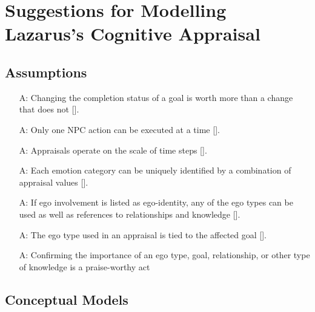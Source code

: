 \section{Suggestions for Modelling Lazarus's Cognitive
Appraisal}\label{appendix_lazarus}

\subsection{Assumptions}

\begin{itemize}
    \item[A\refstepcounter{assumpnum}\theassumpnum \label{A_AchievingGoals}:]
    Changing the completion status of a goal is worth more than a change that
    does not [].

    \item[A\refstepcounter{assumpnum}\theassumpnum \label{A_ActOn}:]
    Only one NPC action can be executed at a time [].

    \item[A\refstepcounter{assumpnum}\theassumpnum \label{A_AppraisalTime}:]
    Appraisals operate on the scale of time steps [].

    \item[A\refstepcounter{assumpnum}\theassumpnum \label{A_emotionRepr}:]
    Each emotion category can be uniquely identified by a combination of
    appraisal values [].

    \item[A\refstepcounter{assumpnum}\theassumpnum \label{A_EgoIdentity}:]
    If ego involvement is listed as ego-identity, any of the ego types can be
    used as well as references to relationships and knowledge
    [].

    \item[A\refstepcounter{assumpnum}\theassumpnum \label{A_PAEgo}:]
    The ego type used in an appraisal is tied to the affected goal
    [].

    \item[A\refstepcounter{assumpnum}\theassumpnum \label{A_EgoAffirmation}:]
    Confirming the importance of an ego type, goal, relationship, or other type
    of knowledge is a praise-worthy act
\end{itemize}

\subsection{Conceptual Models}
~\newline

